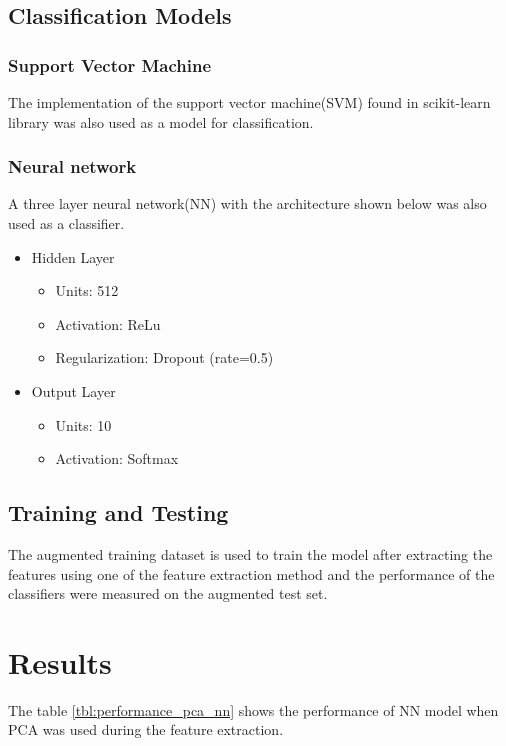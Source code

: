 \documentclass[12pt]{article}
\begin{document}
\subsection{Classification Models}

\subsubsection{Support Vector Machine}
The implementation of the support vector machine(SVM) found in scikit-learn\cite{pedregosa2011scikit} library was also used as a model for classification.

\subsubsection{Neural network}
A three layer neural network(NN) with the architecture shown below was also used as a classifier.

\begin{itemize}
    \item Hidden Layer
    \begin{itemize}
        \item Units: 512
        \item Activation: ReLu
        \item Regularization: Dropout (rate=0.5) 
    \end{itemize}

    \item Output Layer
    \begin{itemize}
        \item Units: 10
        \item Activation: Softmax
    \end{itemize}
\end{itemize}

\subsection{Training and Testing}
The augmented training dataset is used to train the model after extracting the features using one of the feature extraction method 
and the performance of the classifiers were measured on the augmented test set.

\section{Results}
The table \ref{tbl:performance_pca_nn} shows the performance of NN model when PCA was used during the feature extraction.
\end{document}
